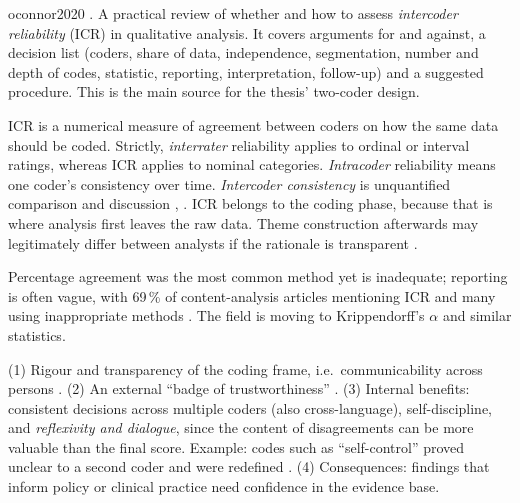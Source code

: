 \begin{papercard}{oconnor2020}
  . A practical review of whether and how to assess \emph{intercoder reliability} (ICR) in qualitative analysis. It covers arguments for and against, a decision list (coders, share of data, independence, segmentation, number and depth of codes, statistic, reporting, interpretation, follow-up) and a suggested procedure. This is the main source for the thesis' two-coder design.

 ICR is a numerical measure of agreement between coders on how the same data should be coded. Strictly, \emph{interrater} reliability applies to ordinal or interval ratings, whereas ICR applies to nominal categories. \emph{Intracoder} reliability means one coder's consistency over time. \emph{Intercoder consistency} is unquantified comparison and discussion , . ICR belongs to the coding phase, because that is where analysis first leaves the raw data. Theme construction afterwards may legitimately differ between analysts if the rationale is transparent .

 Percentage agreement was the most common method yet is inadequate; reporting is often vague, with 69\,\% of content-analysis articles mentioning ICR and many using inappropriate methods . The field is moving to Krippendorff's $\alpha$ and similar statistics.

 (1) Rigour and transparency of the coding frame, i.e.\ communicability across persons . (2) An external ``badge of trustworthiness'' . (3) Internal benefits: consistent decisions across multiple coders (also cross-language), self-discipline, and \emph{reflexivity and dialogue}, since the content of disagreements can be more valuable than the final score. Example: codes such as ``self-control'' proved unclear to a second coder and were redefined . (4) Consequences: findings that inform policy or clinical practice need confidence in the evidence base.


\end{papercard}
